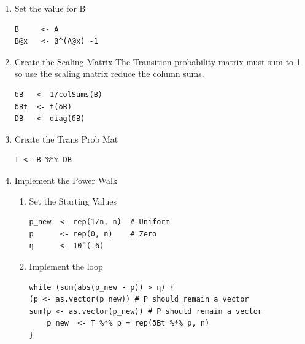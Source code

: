 \documentclass[11pt]{article}
\begin{document}
\begin{enumerate}
\begin{enumerate}
\begin{align}
\begin{array}{c}
       \overrightarrow{\delta^{\tiny{\ensuremath{\boldsymbol{T}}}}} \bullet \vec{p}\\
       \vdots
     \end{array} \right) \nonumber \\
     & = \mathtt{repeat} (\vec{p} \bullet \vec{\delta^{\tiny \mathrm{T}}} \mathtt{, n}) \label{eq:sparse-power-walk}
   \end{align}
\end{enumerate}
\item Set the value for B
\label{sec:org6e6ac6f}
\lstset{language=r,label= ,caption= ,captionpos=b,numbers=none}
\begin{lstlisting}
B     <- A
B@x   <- β^(A@x) -1
\end{lstlisting}

\item Create the Scaling Matrix
\label{sec:org0ebcc16}
The Transition probability matrix must sum to 1 so use the scaling matrix reduce
the column sums.

\lstset{language=r,label= ,caption= ,captionpos=b,numbers=none}
\begin{lstlisting}
δB   <- 1/colSums(B)
δBt  <- t(δB)
DB   <- diag(δB)
\end{lstlisting}

\item Create the Trans Prob Mat
\label{sec:org2b90fd2}
\lstset{language=r,label= ,caption= ,captionpos=b,numbers=none}
\begin{lstlisting}
T <- B %*% DB
\end{lstlisting}

\item Implement the Power Walk
\label{sec:org5ad1227}
\begin{enumerate}
\item Set the Starting Values
\label{sec:org835277b}
\lstset{language=r,label= ,caption= ,captionpos=b,numbers=none}
\begin{lstlisting}
p_new  <- rep(1/n, n)  # Uniform
p      <- rep(0, n)    # Zero
η      <- 10^(-6)
\end{lstlisting}

\item Implement the loop
\label{sec:org1229f35}
\lstset{language=r,label= ,caption= ,captionpos=b,numbers=none}
\begin{lstlisting}
while (sum(abs(p_new - p)) > η) {
(p <- as.vector(p_new)) # P should remain a vector
sum(p <- as.vector(p_new)) # P should remain a vector
    p_new  <- T %*% p + rep(δBt %*% p, n)
}
\end{lstlisting}


\end{enumerate}
\end{enumerate}
\end{document}
